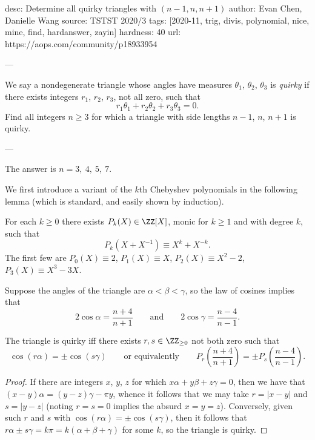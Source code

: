 desc: Determine all quirky triangles with $(n-1,n,n+1)$
author: Evan Chen, Danielle Wang
source: TSTST 2020/3
tags: [2020-11, trig, divis, polynomial, nice, mine, find, hardanswer, zayin]
hardness: 40
url: https://aops.com/community/p18933954

---

We say a nondegenerate triangle whose angles have
measures $\theta_1$, $\theta_2$, $\theta_3$ is \emph{quirky}
if there exists integers $r_1$, $r_2$, $r_3$, not all zero,
such that \[ r_1 \theta_1 + r_2 \theta_2 + r_3 \theta_3 = 0. \]
Find all integers $n \ge 3$ for which a triangle with
side lengths $n-1$, $n$, $n+1$ is quirky.

---


The answer is $n = 3,\ 4,\ 5,\ 7$.

We first introduce a variant of the $k$th Chebyshev polynomials
in the following lemma
(which is standard, and easily shown by induction).
\begin{lemma*}
  For each $k \ge 0$ there exists $P_k(X) \in \ZZ[X]$,
  monic for $k \ge 1$ and with degree $k$, such that
  \[ P_k( X + X^{-1} ) \equiv X^k + X^{-k}. \]
  The first few are $P_0(X) \equiv 2$,
  $P_1(X) \equiv X$, $P_2(X) \equiv X^2-2$, $P_3(X) \equiv X^3-3X$.
\end{lemma*}
Suppose the angles of the triangle are $\alpha < \beta < \gamma$,
so the law of cosines implies that
\[ 2\cos\alpha =\frac{n+4}{n+1} \qquad \text{and} \qquad 2\cos\gamma = \frac{n-4}{n-1}. \]
\begin{claim*}
  The triangle is quirky iff there exists $r,s \in \ZZ_{\ge0}$ not both zero such that
  \[ \cos(r\alpha) = \pm \cos(s\gamma)
    \qquad \text{or equivalently} \qquad
    P_r\left( \frac{n+4}{n+1} \right) = \pm P_s\left( \frac{n-4}{n-1} \right). \]
\end{claim*}
\begin{proof}
If there are integers $x$, $y$, $z$ for which $x\alpha + y\beta + z\gamma = 0$,
then we have that $(x-y)\alpha = (y-z)\gamma - \pi y$,
whence it follows that we may take $r = |x-y|$ and $s = |y-z|$
(noting $r=s=0$ implies the absurd $x=y=z$).
Conversely, given such $r$ and $s$ with $\cos(r\alpha) = \pm \cos(s\gamma)$,
then it follows that $r \alpha \pm s \gamma = k\pi = k(\alpha + \beta + \gamma)$
for some $k$, so the triangle is quirky.
\end{proof}

